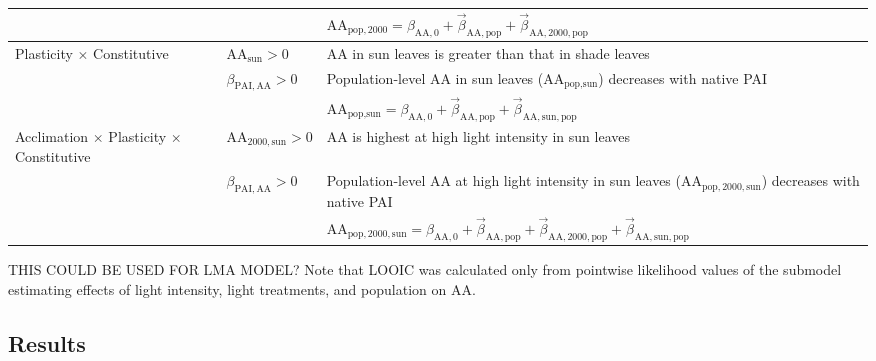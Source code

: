 \documentclass[
  letterpaper,
  DIV=11,
  numbers=noendperiod]{scrartcl}
\newcommand{\aax}{$\mathrm{AA}$}
\begin{document}
\begin{longtable}{>{\raggedright\arraybackslash}p{1in}>{\raggedright\arraybackslash}p{1.5in}>{\raggedright\arraybackslash}p{3in}}
\nopagebreak
 &  & \hspace{-1em}$\mathrm{AA}_{\text{pop},2000} = \beta_{\mathrm{AA}, 0} + \vec{\beta}_{\mathrm{AA}, \text{pop}} + \vec{\beta}_{\mathrm{AA}, 2000, \text{pop}}$\\
\cmidrule{1-3}\pagebreak[0]
Plasticity $\times$ Constitutive & $\mathrm{AA}_{\text{sun}} > 0$ & \hspace{-1em}\aax{} in sun leaves is greater than that in shade leaves\\
\nopagebreak
 & $\beta_{\mathrm{PAI,AA}} > 0$ & \hspace{-1em}Population-level \aax{} in sun leaves ($\mathrm{AA}_{\text{pop},\text{sun}}$) decreases with native PAI\\
\nopagebreak
 &  & \hspace{-1em}$\mathrm{AA}_{\text{pop},\text{sun}} = \beta_{\mathrm{AA}, 0} + \vec{\beta}_{\mathrm{AA}, \text{pop}} + \vec{\beta}_{\mathrm{AA}, \text{sun}, \text{pop}}$\\
\cmidrule{1-3}\pagebreak[0]
Acclimation $\times$ Plasticity $\times$ Constitutive & $\mathrm{AA}_{2000,\text{sun}} > 0$ & \hspace{-1em}\aax{} is highest at high light intensity in sun leaves\\
\nopagebreak
 & $\beta_{\mathrm{PAI,AA}} > 0$ & \hspace{-1em}Population-level \aax{} at high light intensity in sun leaves ($\mathrm{AA}_{\text{pop},2000,\text{sun}}$) decreases with native PAI\\
\nopagebreak
 &  & \hspace{-1em}$\mathrm{AA}_{\text{pop},2000,\text{sun}} = \beta_{\mathrm{AA}, 0} + \vec{\beta}_{\mathrm{AA}, \text{pop}} + \vec{\beta}_{\mathrm{AA}, 2000, \text{pop}} + \vec{\beta}_{\mathrm{AA}, \text{sun}, \text{pop}}$\\
\bottomrule

\end{longtable}

THIS COULD BE USED FOR LMA MODEL? Note that LOOIC was calculated only
from pointwise likelihood values of the submodel estimating effects of
light intensity, light treatments, and population on \aax{}.

\subsection{Results}\label{results}
\end{document}
